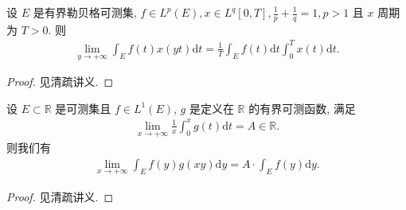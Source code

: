 \documentclass[../../main.tex]{subfiles}
\begin{document}
\begin{theorem}[$L^p$版本Riemann引理]\label{theorem:L^p版本Riemann引理}
设 $E$ 是有界勒贝格可测集, $f \in L^p(E), x \in L^q[0,T], \frac{1}{p} + \frac{1}{q} = 1, p > 1$ 且 $x$ 周期为 $T > 0$. 则
\begin{align*}
\lim_{y \to +\infty} \int_E f(t) x(yt) \mathrm{d}t = \frac{1}{T} \int_E f(t) \mathrm{d}t \int_0^T x(t) \mathrm{d}t.
\end{align*}
\end{theorem}
\begin{proof}
见清疏讲义.
\end{proof}

\begin{theorem}\label{theorem:L^1版本的Riemann引理}
设 $E \subset \mathbb{R}$ 是可测集且 $f \in L^1(E)$, $g$ 是定义在 $\mathbb{R}$ 的有界可测函数, 满足
\begin{align*}
\lim_{x \to +\infty} \frac{1}{x} \int_0^x g(t) \mathrm{d}t = A \in \mathbb{R}.
\end{align*}
则我们有
\begin{align*}
\lim_{x \to +\infty} \int_E f(y) g(xy) \mathrm{d}y = A \cdot \int_E f(y) \mathrm{d}y.
\end{align*}
\end{theorem}
\begin{proof}
见清疏讲义.
\end{proof}
\end{document}
